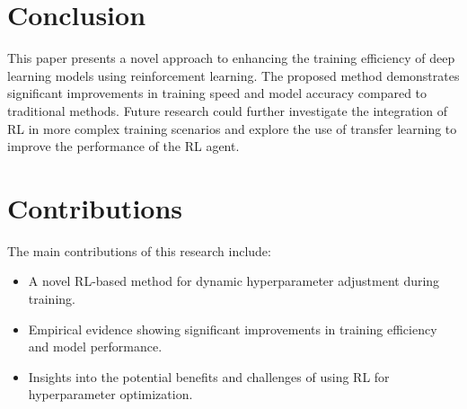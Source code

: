 \documentclass{article}
\begin{document}
\section{Conclusion}
This paper presents a novel approach to enhancing the training efficiency of deep learning models using reinforcement learning. The proposed method demonstrates significant improvements in training speed and model accuracy compared to traditional methods. Future research could further investigate the integration of RL in more complex training scenarios and explore the use of transfer learning to improve the performance of the RL agent.

\section{Contributions}
The main contributions of this research include:
\begin{itemize}
    \item A novel RL-based method for dynamic hyperparameter adjustment during training.
    \item Empirical evidence showing significant improvements in training efficiency and model performance.
    \item Insights into the potential benefits and challenges of using RL for hyperparameter optimization.
\end{itemize}
\end{document}
